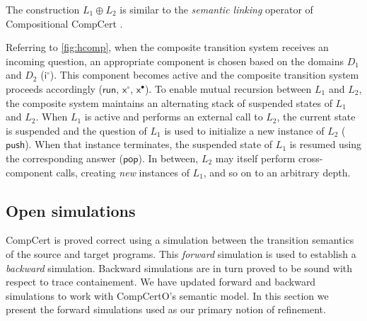 \documentclass[sigplan,10pt,review]{acmart}
\newcommand{\kw}[1]{\ensuremath{ \mathsf{#1} }}
\newcommand{\que}{\circ}
\newcommand{\ans}{\bullet}
\begin{document}
The construction $L_1 \oplus L_2$
is similar to
the \emph{semantic linking} operator of
Compositional CompCert \cite{compcompcert}.

Referring to \autoref{fig:hcomp},
when the composite transition system
receives an incoming question,
an appropriate component is chosen
based on the domains $D_1$ and $D_2$
($\kw{i}^\que$).
This component becomes active
and the composite transition system
proceeds accordingly ($\kw{run}$, $\kw{x}^\que$, $\kw{x}^\ans$).
%
To enable mutual recursion between $L_1$ and $L_2$,
the composite system
maintains an alternating stack of suspended states
of $L_1$ and $L_2$.
When $L_1$ is active
and performs an external call to $L_2$,
the current state is suspended
and the question of $L_1$
is used to initialize a new instance of $L_2$
($\kw{push}$).
When that instance terminates,
the suspended state of $L_1$ is resumed
using the corresponding answer ($\kw{pop}$).
In between,
$L_2$ may itself perform cross-component calls,
creating \emph{new} instances of $L_1$,
and so on to an arbitrary depth.



\subsection{Open simulations} \label{sec:sem:ref} %

CompCert is proved correct using a simulation
between the transition semantics of the source and target programs.
This \emph{forward}
simulation is used to establish a \emph{backward} simulation.
Backward simulations
are in turn proved to be sound with respect to trace containement.
We have updated forward and backward simulations to
work with CompCertO's semantic model.
In this section we present the forward simulations
used as our primary notion of refinement.

\end{document}
